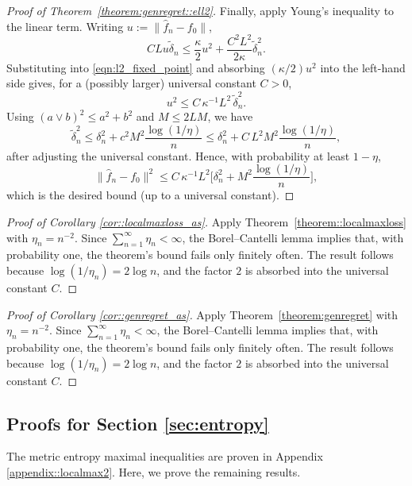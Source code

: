 \documentclass[11pt]{article}
\theoremstyle{plain}
\theoremstyle{definition} %
\begin{document}
\begin{proof}[Proof of Theorem~\ref{theorem:genregret::ell2}]
Finally, apply Young's inequality to the linear term. Writing $u:=\|\hat f_n-f_0\|$,
\[
CLu\tilde\delta_n
\le
\frac{\kappa}{2}u^2
+
\frac{C^2L^2}{2\kappa}\tilde\delta_n^2.
\]
Substituting into \eqref{eqn:l2_fixed_point} and absorbing $(\kappa/2)u^2$ into the left-hand side
gives, for a (possibly larger) universal constant $C>0$,
\[
u^2
\le
C\,\kappa^{-1}L^2\,\tilde\delta_n^2.
\]
Using $(a\vee b)^2\le a^2+b^2$ and $M\le 2LM$, we have
\[
\tilde\delta_n^2
\le
\delta_n^2
+
c^2M^2\frac{\log(1/\eta)}{n}
\le
\delta_n^2
+
C\,L^2M^2\frac{\log(1/\eta)}{n},
\]
after adjusting the universal constant. Hence, with probability at least $1-\eta$,
\[
\|\hat f_n-f_0\|^2
\le
C\,\kappa^{-1}L^2\Biggl[
\delta_n^2
+
M^2\frac{\log(1/\eta)}{n}
\Biggr],
\]
which is the desired bound (up to a universal constant).
\end{proof}
 


\begin{proof}[Proof of Corollary \ref{cor::localmaxloss_as}]
Apply Theorem~\ref{theorem::localmaxloss} with \(\eta_n=n^{-2}\). Since
\(\sum_{n=1}^\infty \eta_n<\infty\), the Borel--Cantelli lemma implies that, with probability one, the theorem's bound fails only finitely often. The result follows because \(\log(1/\eta_n)=2\log n\), and the factor \(2\) is absorbed into the universal constant \(C\).
\end{proof}
\begin{proof}[Proof of Corollary \ref{cor::genregret_as}]
Apply Theorem~\ref{theorem:genregret} with \(\eta_n=n^{-2}\). Since \(\sum_{n=1}^\infty \eta_n<\infty\), the Borel--Cantelli lemma implies that, with probability one, the theorem's bound fails only finitely often. The result follows because \(\log(1/\eta_n)=2\log n\), and the factor \(2\) is absorbed into the universal constant \(C\).
\end{proof}


\subsection{Proofs for Section \ref{sec:entropy}}

The metric entropy maximal inequalities are proven in Appendix \ref{appendix::localmax2}. Here, we prove the remaining results.
\end{document}
